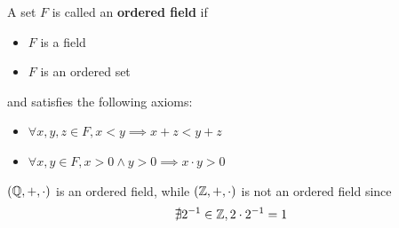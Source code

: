 A set $F$ is called an \textbf{ordered field} if
\begin{itemize}
    \item $F$ is a field
    \item $F$ is an ordered set
\end{itemize}
and satisfies the following axioms:
\begin{itemize}
    \item $\forall x, y, z \in F, x < y \implies x + z < y + z$
    \item $\forall x, y \in F, x > 0 \land y > 0 \implies x \cdot y > 0$
\end{itemize}

\bigskip

\begin{example}
    $(\mathbb{Q}, +, \cdot)$ is an ordered field, while $(\mathbb{Z}, +, \cdot)$ is not an ordered field since
    \[
    \nexists 2^{-1} \in \mathbb{Z}, 2 \cdot 2^{-1} = 1
    \]
\end{example}
